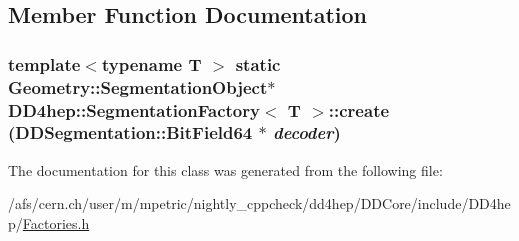 \subsection{Member Function Documentation}
\hypertarget{class_d_d4hep_1_1_segmentation_factory_a57196e0678ec341aa3e0463334a723b4}{
\subsubsection[{create}]{\setlength{\rightskip}{0pt plus 5cm}template$<$typename T $>$ static {\bf Geometry::SegmentationObject}$\ast$ {\bf DD4hep::SegmentationFactory}$<$ {\bf T} $>$::create ({\bf DDSegmentation::BitField64} $\ast$ {\em decoder})}}
\label{class_d_d4hep_1_1_segmentation_factory_a57196e0678ec341aa3e0463334a723b4}


The documentation for this class was generated from the following file:\begin{DoxyCompactItemize}
\item 
/afs/cern.ch/user/m/mpetric/nightly\_\-cppcheck/dd4hep/DDCore/include/DD4hep/\hyperlink{_d_d_core_2include_2_d_d4hep_2_factories_8h}{Factories.h}\end{DoxyCompactItemize}
